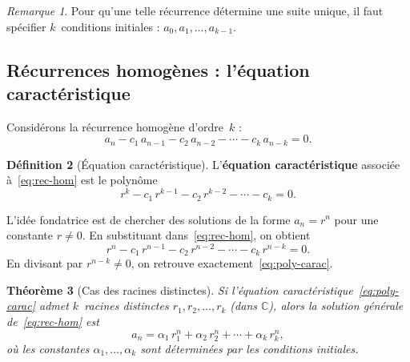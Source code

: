 \documentclass[12pt,a4paper,openany]{book}
\theoremstyle{definition}
\newtheorem{definition}{Définition}[chapter]
\theoremstyle{plain}
\newtheorem{theoreme}[definition]{Théorème}
\theoremstyle{remark}
\newtheorem{remarque}[definition]{Remarque}
\newcommand{\C}{\mathbb{C}}
\begin{document}
\begin{remarque}
Pour qu'une telle récurrence détermine une suite unique, il faut spécifier
$k$~conditions initiales : $a_0, a_1, \ldots, a_{k-1}$.
\end{remarque}

\subsection{Récurrences homogènes : l'équation caractéristique}
\label{subsec:rec-homogene}

Considérons la récurrence homogène d'ordre~$k$ :
\begin{equation}
\label{eq:rec-hom}
  a_n - c_1\, a_{n-1} - c_2\, a_{n-2} - \cdots - c_k\, a_{n-k} = 0.
\end{equation}

\begin{definition}[Équation caractéristique]
\label{def:eq-carac}
L'\textbf{équation caractéristique} associée à~\eqref{eq:rec-hom} est le polynôme
\begin{equation}
\label{eq:poly-carac}
  r^k - c_1\, r^{k-1} - c_2\, r^{k-2} - \cdots - c_k = 0.
\end{equation}
\end{definition}

L'idée fondatrice est de chercher des solutions de la forme $a_n = r^n$ pour une
constante $r \neq 0$. En substituant dans~\eqref{eq:rec-hom}, on obtient
\[
  r^n - c_1\, r^{n-1} - c_2\, r^{n-2} - \cdots - c_k\, r^{n-k} = 0.
\]
En divisant par $r^{n-k} \neq 0$, on retrouve exactement~\eqref{eq:poly-carac}.

\begin{theoreme}[Cas des racines distinctes]
\label{thm:racines-distinctes}
Si l'équation caractéristique~\eqref{eq:poly-carac} admet $k$~racines
distinctes $r_1, r_2, \ldots, r_k$ (dans $\C$), alors la solution générale
de~\eqref{eq:rec-hom} est
\[
  a_n = \alpha_1\, r_1^n + \alpha_2\, r_2^n + \cdots + \alpha_k\, r_k^n,
\]
où les constantes $\alpha_1, \ldots, \alpha_k$ sont déterminées par les
conditions initiales.
\end{theoreme}
\end{document}
